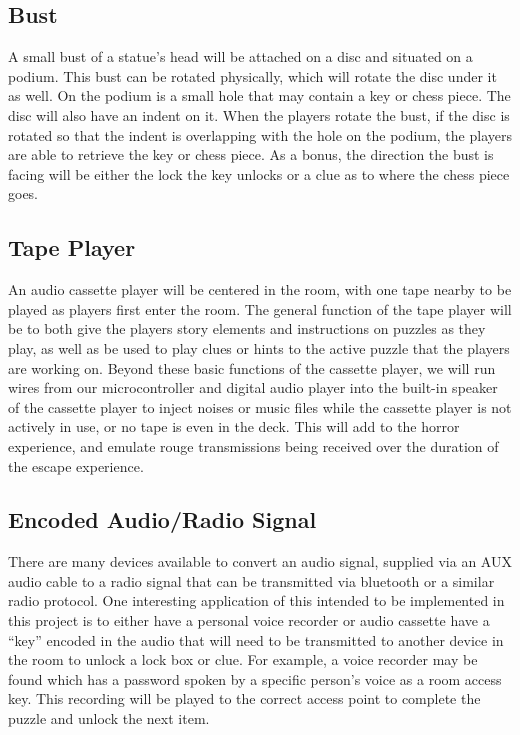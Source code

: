 \documentclass[conference]{IEEEtran}
\begin{document}
\subsection{Bust} %
A small bust of a statue's head will be attached on a disc and situated
on a podium. This bust can be rotated physically, which will rotate the
disc under it as well. On the podium is a small hole that may contain a key
or chess piece. The disc will also have an indent on it. When the players
rotate the bust, if the disc is rotated so that the indent is overlapping
with the hole on the podium, the players are able to retrieve the key
or chess piece. As a bonus, the direction the bust is facing will be either
the lock the key unlocks or a clue as to where the chess piece goes.

\subsection{Tape Player}
An audio cassette player will be centered in the room, with one tape nearby
to be played as players first enter the room. The general function of the tape
player will be to both give the players story elements and instructions on
puzzles as they play, as well as be used to play clues or hints to the active
puzzle that the players are working on. Beyond these basic functions of the
cassette player, we will run wires from our microcontroller and digital audio
player into the built-in speaker of the cassette player to inject noises or music
files while the cassette player is not actively in use, or no tape is even in the
deck. This will add to the horror experience, and emulate rouge transmissions
being received over the duration of the escape experience.

\subsection{Encoded Audio/Radio Signal}
There are many devices available to convert an audio signal, supplied via an AUX audio cable
to a radio signal that can be transmitted via bluetooth or a similar radio protocol. One interesting
application of this intended to be implemented in this project is to either have a personal voice recorder
or audio cassette have a ``key'' encoded in the audio that will need to be transmitted to another
device in the room to unlock a lock box or clue. For example, a voice recorder may be found which has
a password spoken by a specific person's voice as a room access key. This recording will be played
to the correct access point to complete the puzzle and unlock the next item.
\end{document}
